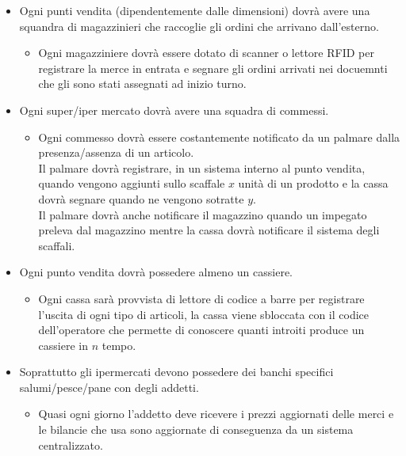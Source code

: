 \documentclass{report}
\begin{document}
   \begin{itemize}
        \item Ogni punti vendita (dipendentemente dalle dimensioni) dovrà avere una squandra di magazzinieri che raccoglie gli ordini che arrivano dall'esterno.
        \begin{itemize}
            \item Ogni magazziniere dovrà essere dotato di scanner o lettore RFID per registrare la merce in entrata e segnare gli ordini arrivati nei docuemnti che gli sono stati assegnati ad inizio turno.
        \end{itemize}

        \item Ogni super/iper mercato dovrà avere una squadra di commessi.
        \begin{itemize}
            \item Ogni commesso dovrà essere costantemente notificato da un palmare dalla presenza/assenza di un articolo.\\
                Il palmare dovrà registrare, in un sistema interno al punto vendita, quando vengono aggiunti sullo scaffale $x$ unità di un prodotto e la cassa dovrà segnare quando ne vengono sotratte $y$.\\
                Il palmare dovrà anche notificare il magazzino quando un impegato preleva dal magazzino mentre la cassa dovrà notificare il sistema degli scaffali.
        \end{itemize}

        \item Ogni punto vendita dovrà possedere almeno un cassiere.
        \begin{itemize}
            \item Ogni cassa sarà provvista di lettore di codice a barre per registrare l'uscita di ogni tipo di articoli, la cassa viene sbloccata con il codice dell'operatore che permette di conoscere quanti introiti produce un cassiere in $n$ tempo.
        \end{itemize}

        \item Soprattutto gli ipermercati devono possedere dei banchi specifici salumi/pesce/pane con degli addetti.
        \begin{itemize}
            \item Quasi ogni giorno l'addetto deve ricevere i prezzi aggiornati delle merci e le bilancie che usa sono aggiornate di conseguenza da un sistema centralizzato.
        \end{itemize}
   \end{itemize}
\end{document}
